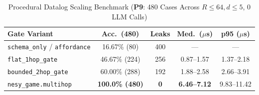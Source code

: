 \begin{table}[!tbp]
\caption{Procedural Datalog Scaling Benchmark (\textbf{P9}: 480 Cases Across $R{\le}64, d{\le}5$, 0 LLM Calls)}
\label{tab:phase5-aamas-datalog}
\centering
\scriptsize
\setlength{\tabcolsep}{3pt}
\begin{tabularx}{\columnwidth}{@{}lcccc@{}}
\toprule
\textbf{Gate Variant} & \textbf{Acc.\ (480)} & \textbf{Leaks} & \textbf{Med.\ ($\mu$s)} & \textbf{p95 ($\mu$s)} \\
\midrule
\texttt{schema\_only} / \texttt{affordance} & 16.67\% (80) & 400 & --- & --- \\
\texttt{flat\_1hop\_gate} & 46.67\% (224) & 256 & 0.87--1.57 & 1.37--2.18 \\
\texttt{bounded\_2hop\_gate} & 60.00\% (288) & 192 & 1.88--2.58 & 2.66--3.91 \\
\texttt{nesy\_game.multihop} & \textbf{100.0\% (480)} & \textbf{0} & \textbf{6.46--7.12} & 9.83--11.42 \\
\bottomrule
\end{tabularx}
\end{table}

